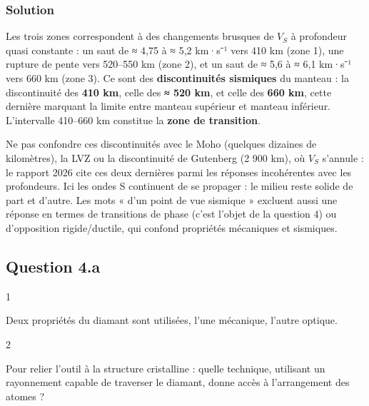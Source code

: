 \documentclass[11pt,a4paper]{article}
\begin{document}
\hypertarget{solution-8}{%
\subsubsection{Solution}\label{solution-8}}

Les trois zones correspondent à des changements brusques de \(V_S\) à profondeur quasi constante : un saut de ≈ 4,75 à ≈ 5,2 km·s⁻¹ vers 410 km (zone 1), une rupture de pente vers 520--550 km (zone 2), et un saut de ≈ 5,6 à ≈ 6,1 km·s⁻¹ vers 660 km (zone 3). Ce sont des \textbf{discontinuités sismiques} du manteau : la discontinuité des \textbf{410 km}, celle des \textbf{≈ 520 km}, et celle des \textbf{660 km}, cette dernière marquant la limite entre manteau supérieur et manteau inférieur. L'intervalle 410--660 km constitue la \textbf{zone de transition}.

\begin{piege}

Ne pas confondre ces discontinuités avec le Moho (quelques dizaines de kilomètres), la LVZ ou la discontinuité de Gutenberg (2 900 km), où \(V_S\) s'annule : le rapport 2026 cite ces deux dernières parmi les réponses incohérentes avec les profondeurs. Ici les ondes S continuent de se propager : le milieu reste solide de part et d'autre. Les mots « d'un point de vue sismique » excluent aussi une réponse en termes de transitions de phase (c'est l'objet de la question 4) ou d'opposition rigide/ductile, qui confond propriétés mécaniques et sismiques.

\end{piege}

\hypertarget{question-4.a}{%
\subsection{Question 4.a}\label{question-4.a}}

\begin{indication}{1}

Deux propriétés du diamant sont utilisées, l'une mécanique, l'autre optique.

\end{indication}

\begin{indication}{2}

Pour relier l'outil à la structure cristalline : quelle technique, utilisant un rayonnement capable de traverser le diamant, donne accès à l'arrangement des atomes ?

\end{indication}
\end{document}
